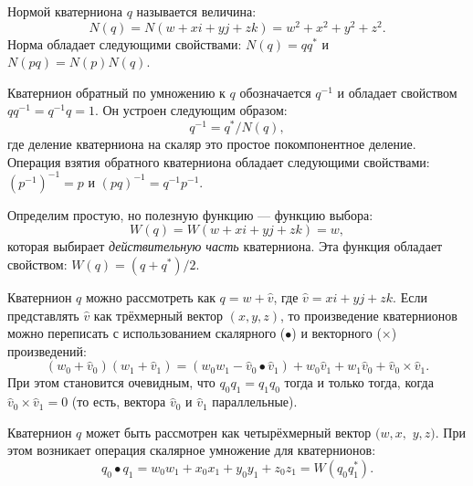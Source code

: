 \documentclass[draft]{article}
\begin{document}
Нормой кватерниона $q$ называется величина:
\begin{equation}
\label{eq:4}
N(q) = N(w + xi + yj + zk) = w^2 + x^2 + y^2 + z^2 .
\end{equation}
Норма обладает следующими свойствами: $N(q) = q  q^*$ и $N(p q) = N(p) N(q)$.

Кватернион обратный по умножению к $q$ обозначается $q^{-1}$
и обладает свойством $q q^{-1} = q^{-1} q = 1$. Он устроен следующим образом:
\begin{equation}
\label{eq:5}
q^{-1}=q^*/N(q) ,
\end{equation}
где деление кватерниона на скаляр это простое покомпонентное деление. Операция взятия обратного кватерниона обладает следующими свойствами: $(p^{-1})^{-1} = p$ и $(p q)^{-1} = q^{-1} p^{-1}$.

Определим простую, но полезную функцию — функцию выбора:
\begin{equation}
\label{eq:6}
W(q) = W(w + x i + y j + z k) = w , 
\end{equation}
которая выбирает {\it действительную часть} кватерниона. Эта функция обладает свойством: $W(q) = (q + q^*)/2$.

Кватернион $q$ можно рассмотреть как $q = w + \widehat{v}$, где $\widehat{v} = x i + y j + z k$. Если представлять $\widehat{v}$ как трёхмерный вектор $(x, y, z)$, то произведение кватернионов можно переписать с использованием скалярного ($\bullet$) и векторного ($\times$) произведений:
\begin{equation}
\label{eq:7}
(w_0 + \widehat{v}_0)(w_1 + \widehat{v}_1) = (w_0 w_1 - \widehat{v}_0\bullet\widehat{v}_1) + w_0 \widehat{v}_1 + w_1\widehat{v}_0 + \widehat{v}_0\times\widehat{v}_1 .
\end{equation}
При этом становится очевидным, что $q_0 q_1 = q_1 q_0$ тогда и только тогда, когда $\widehat{v}_0\times\widehat{v}_1 = 0$ (то есть, вектора $\widehat{v}_0$ и $\widehat{v}_1$ параллельные).

Кватернион $q$ может быть рассмотрен как четырёхмерный вектор $(w, x,$ $y, z)$. При этом возникает операция скалярное умножение для кватернионов:
\begin{equation}
\label{eq:8}
q_0\bullet q_1 = w_0 w_1 + x_0 x_1 + y_0 y_1 + z_0 z_1 = W(q_0 q_1^*) .
\end{equation}
\end{document}
